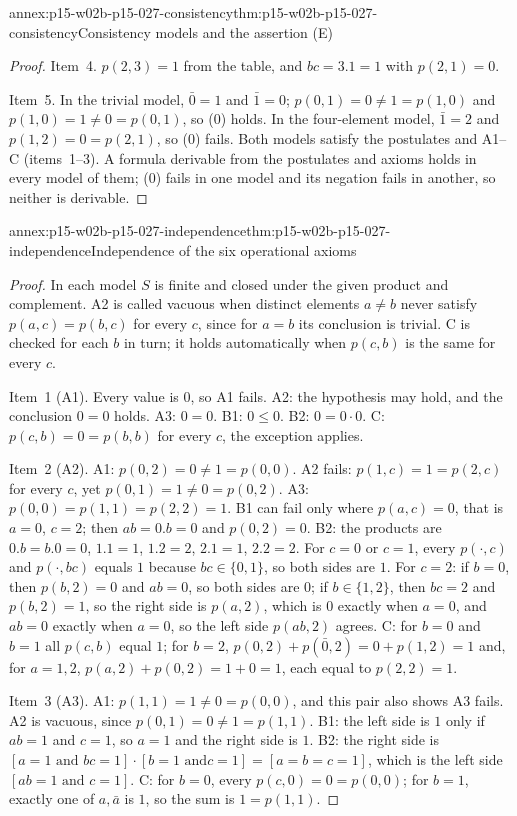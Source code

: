 \begin{annexitem}{annex:p15-w02b-p15-027-consistency}{thm:p15-w02b-p15-027-consistency}{Consistency models and the assertion (E)}
\begin{proof}
Item~4. \(p(2,3)=1\) from the table, and \(bc=3.1=1\) with \(p(2,1)=0\).

Item~5. In the trivial model, \(\bar0=1\) and \(\bar1=0\);
\(p(0,1)=0\neq1=p(1,0)\) and \(p(1,0)=1\neq0=p(0,1)\), so (0) holds. In the
four-element model, \(\bar1=2\) and \(p(1,2)=0=p(2,1)\), so (0) fails.
Both models satisfy the postulates and A1--C (items~1--3). A formula
derivable from the postulates and axioms holds in every model of them;
(0) fails in one model and its negation fails in another, so neither is
derivable.
\end{proof}
\end{annexitem}

\begin{annexitem}{annex:p15-w02b-p15-027-independence}{thm:p15-w02b-p15-027-independence}{Independence of the six operational axioms}
\begin{proof}
In each model \(S\) is finite and closed under the given product and
complement. A2 is called vacuous when distinct elements \(a\neq b\) never
satisfy \(p(a,c)=p(b,c)\) for every \(c\), since for \(a=b\) its
conclusion is trivial. C is checked for each \(b\) in turn; it holds
automatically when \(p(c,b)\) is the same for every \(c\).

Item~1 (A1). Every value is \(0\), so A1 fails. A2: the hypothesis may
hold, and the conclusion \(0=0\) holds. A3: \(0=0\). B1: \(0\leqslant0\).
B2: \(0=0\cdot0\). C: \(p(c,b)=0=p(b,b)\) for every \(c\), the exception
applies.

Item~2 (A2). A1: \(p(0,2)=0\neq1=p(0,0)\). A2 fails: \(p(1,c)=1=p(2,c)\)
for every \(c\), yet \(p(0,1)=1\neq0=p(0,2)\). A3: \(p(0,0)=p(1,1)=p(2,2)=1\).
B1 can fail only where \(p(a,c)=0\), that is \(a=0\), \(c=2\); then
\(ab=0.b=0\) and \(p(0,2)=0\). B2: the products are \(0.b=b.0=0\),
\(1.1=1\), \(1.2=2\), \(2.1=1\), \(2.2=2\). For \(c=0\) or \(c=1\), every
\(p(\cdot,c)\) and \(p(\cdot,bc)\) equals \(1\) because \(bc\in\{0,1\}\),
so both sides are \(1\). For \(c=2\): if \(b=0\), then \(p(b,2)=0\) and
\(ab=0\), so both sides are \(0\); if \(b\in\{1,2\}\), then \(bc=2\) and
\(p(b,2)=1\), so the right side is \(p(a,2)\), which is \(0\) exactly when
\(a=0\), and \(ab=0\) exactly when \(a=0\), so the left side
\(p(ab,2)\) agrees. C: for \(b=0\) and \(b=1\) all \(p(c,b)\) equal \(1\);
for \(b=2\), \(p(0,2)+p(\bar0,2)=0+p(1,2)=1\) and, for \(a=1,2\),
\(p(a,2)+p(0,2)=1+0=1\), each equal to \(p(2,2)=1\).

Item~3 (A3). A1: \(p(1,1)=1\neq0=p(0,0)\), and this pair also shows A3
fails. A2 is vacuous, since \(p(0,1)=0\neq1=p(1,1)\). B1: the left side
is \(1\) only if \(ab=1\) and \(c=1\), so \(a=1\) and the right side is
\(1\). B2: the right side is \([a=1\text{ and }bc=1]\cdot[b=1\text{ and
}c=1]=[a=b=c=1]\), which is the left side \([ab=1\text{ and }c=1]\). C:
for \(b=0\), every \(p(c,0)=0=p(0,0)\); for \(b=1\), exactly one of
\(a,\bar a\) is \(1\), so the sum is \(1=p(1,1)\).


\end{proof}
\end{annexitem}

